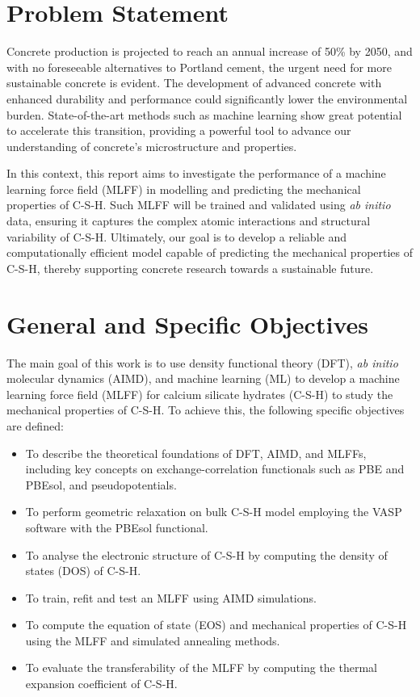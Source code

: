 \section{Problem Statement}
Concrete production is projected to reach an annual increase of 50\% by 2050\supercite{Monteiro2017}, and with no foreseeable alternatives to Portland cement, the urgent need for more sustainable concrete is evident. The development of advanced concrete with enhanced durability and performance could significantly lower the environmental burden. State-of-the-art methods such as machine learning show great potential to accelerate this transition, providing a powerful tool to advance our understanding of concrete's microstructure and properties. 

In this context, this report aims to investigate the performance of a machine learning force field (MLFF) in modelling and predicting the mechanical properties of C-S-H. Such MLFF will be trained and validated
using \emph{ab initio} data, ensuring it captures the complex atomic interactions and structural variability of C-S-H. Ultimately, our goal is to develop a reliable and computationally efficient model capable of predicting the mechanical properties of C-S-H, thereby supporting concrete research towards a sustainable future.

\section{General and Specific Objectives}
The main goal of this work is to use density functional theory (DFT), \emph{ab initio} molecular dynamics (AIMD), and machine learning (ML) to
develop a machine learning force field (MLFF) for calcium silicate hydrates (C-S-H) to study the mechanical properties of C-S-H. To achieve this, the following specific objectives are defined:
\begin{itemize}
    \item To describe the theoretical foundations of DFT, AIMD, and MLFFs, including key concepts on exchange-correlation functionals such as PBE and PBEsol, and pseudopotentials. 
    \item To perform geometric relaxation on bulk C-S-H model employing the VASP software with the PBEsol functional.
    \item To analyse the electronic structure of C-S-H by computing the density of states (DOS) of C-S-H.
    \item To train, refit and test an MLFF using AIMD simulations. 
    \item To compute the equation of state (EOS) and mechanical properties of C-S-H using the MLFF and simulated annealing methods.
    \item To evaluate the transferability of the MLFF by computing the thermal expansion coefficient of C-S-H. 
\end{itemize}

